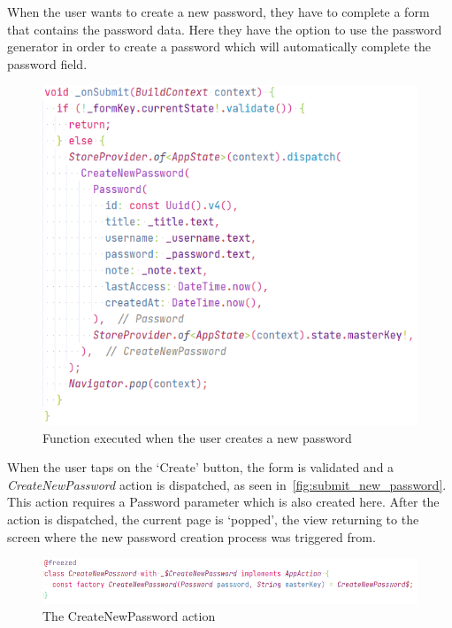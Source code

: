 \documentclass[a4paper,12pt]{report}
\begin{document}
When the user wants to create a new password, they have to complete a form that
contains the password data. Here they have the option to use the password
generator in order to create a password which will automatically complete the
password field.

\begin{figure}[H]
    \centering
    \includegraphics[scale=0.6]{images/code/submit_new_password.png}
    \caption{Function executed when the user creates a new password}\label{fig:submit_new_password}
\end{figure}

When the user taps on the `Create' button, the form is validated and a
\textit{CreateNewPassword} action is dispatched, as seen
in~\autoref{fig:submit_new_password}. This action requires a Password parameter
which is also created here. After the action is dispatched, the current page is
`popped', the view returning to the screen where the new password creation
process was triggered from.

\begin{figure}[H]
    \centering
    \includegraphics[scale=0.6]{images/code/create_new_password_simple_action.png}
    \caption{The CreateNewPassword action}\label{fig:create_new_password_action}
\end{figure}
\end{document}
